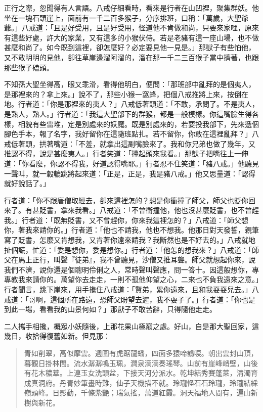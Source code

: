 正行之際，忽聞得有人言語。八戒仔細看時，看來是行者在山凹裡，聚集群妖。他坐在一塊石頭崖上，面前有一千二百多猴子，分序排班，口稱：「萬歲，大聖爺爺。」八戒道：「且是好受用，且是好受用，怪道他不肯做和尚，只要來家哩，原來有這些好處，許大的家業，又有這多的小猴伏侍。若是老豬有這一座山場，也不做甚麼和尚了。如今既到這裡，卻怎麼好？必定要見他一見是。」那獃子有些怕他，又不敢明明的見他，卻往草崖邊溜阿溜的，溜在那一千二三百猴子當中擠著，也跟那些猴子磕頭。

不知孫大聖坐得高，眼又乖滑，看得他明白，便問：「那班部中亂拜的是個夷人，是那裡來的？拿上來。」說不了，那些小猴一窩蜂，把個八戒推將上來，按倒在地。行者道：「你是那裡來的夷人？」八戒低著頭道：「不敢，承問了。不是夷人，是熟人，熟人。」行者道：「我這大聖部下的群猴，都是一般模樣。你這嘴臉生得各樣，相貌有些雷堆，定是別處來的妖魔。既是別處來的，若要投我部下，先來遞個腳色手本，報了名字，我好留你在這隨班點扎。若不留你，你敢在這裡亂拜？」八戒低著頭，拱著嘴道：「不羞，就拿出這副嘴臉來了。我和你兄弟也做了幾年，又推認不得，說是甚麼夷人。」行者笑道：「擡起頭來我看。」那獃子把嘴往上一伸道：「你看麼，你認不得我，好道認得嘴耶。」行者忍不住笑道：「豬八戒。」他聽見一聲叫，就一轂轆跳將起來道：「正是，正是，我是豬八戒。」他又思量道：「認得就好說話了。」

行者道：「你不跟唐僧取經去，卻來這裡怎的？想是你衝撞了師父，師父也貶你回來了。有甚貶書，拿來我看。」八戒道：「不曾衝撞他，他也沒甚麼貶書，也不曾趕我。」行者道：「既無貶書，又不曾趕你，你來我這裡怎的？」八戒道：「師父想你，著我來請你的。」行者道：「他也不請我，他也不想我。他那日對天發誓，親筆寫了貶書，怎麼又肯想我，又肯著你遠來請我？我斷然也是不好去的。」八戒就地扯個謊，忙道：「委是想你，委是想你。」行者道：「他怎的想我來？」八戒道：「師父在馬上正行，叫聲『徒弟』，我不曾聽見，沙僧又推耳聾。師父就想起你來，說我們不濟，說你還是個聰明伶俐之人，常時聲叫聲應，問一答十。因這般想你，專專教我來請你的。萬望你去走走，一則不孤他仰望之心，二來也不負我遠來之意。」行者聞言，跳下崖來，用手攙住八戒道：「賢弟，累你遠來，且和我耍耍兒去。」八戒道：「哥啊，這個所在路遠，恐師父盼望去遲，我不耍子了。」行者道：「你也是到此一場，看看我的山景何如？」那獃子不敢苦辭，只得隨他走走。

二人攜手相攙，概眾小妖隨後，上那花果山極巔之處。好山，自是那大聖回家，這幾日，收拾得復舊如新。但見那：
\begin{quote}
青如削翠，高似摩雲。週圍有虎踞龍蟠，四面多猿啼鶴唳。朝出雲封山頂，暮觀日掛林間。流水潺潺鳴玉珮，澗泉滴滴奏瑤琴。山前有崖峰峭壁，山後有花木穠華。上連玉女洗頭盆，下接天河分派水。乾坤結秀賽蓬萊，清濁育成真洞府。丹青妙筆畫時難，仙子天機描不就。玲瓏怪石石玲瓏，玲瓏結綵嶺頭峰。日影動，千條紫艷；瑞氣搖，萬道紅霞。洞天福地人間有，遍山新樹與新花。
\end{quote}

